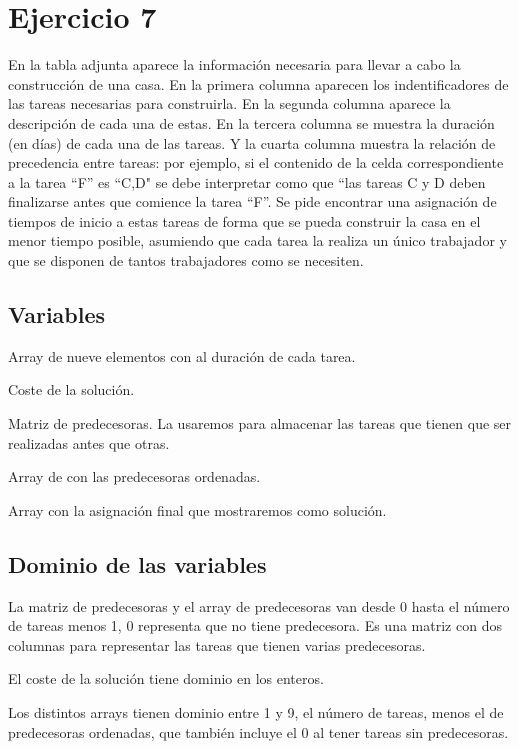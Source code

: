 \documentclass[11pt, spanish]{article}
\begin{document}
\newpage

\section{Ejercicio 7}

En la tabla adjunta aparece la información necesaria para llevar a cabo la construcción de una casa. En la primera columna aparecen los indentificadores de las tareas necesarias para
construirla. En la segunda columna aparece la descripción de cada una de estas. En la tercera columna se muestra la duración (en días) de cada una de las tareas. Y la cuarta columna muestra la relación de precedencia entre tareas: por ejemplo, si el contenido de la celda correspondiente a la tarea “F” es “C,D" se debe interpretar como que “las tareas C y D deben finalizarse antes que comience la tarea “F”. Se pide encontrar una asignación de tiempos de inicio a estas tareas de forma que se pueda construir la casa en el menor tiempo posible, asumiendo que cada tarea la realiza un único trabajador y que se disponen de tantos trabajadores como se necesiten.

\subsection{Variables}

Array de nueve elementos con al duración de cada tarea.

Coste de la solución.

Matriz de predecesoras. La usaremos para almacenar las tareas que tienen que ser realizadas antes que otras.

Array de con las predecesoras ordenadas.

Array con la asignación final que mostraremos como solución.

\subsection{Dominio de las variables}

La matriz de predecesoras y el array de predecesoras van desde 0 hasta el número de tareas menos 1, 0 representa que no tiene predecesora. Es una matriz con dos columnas para representar las tareas que tienen varias predecesoras.

El coste de la solución tiene dominio en los enteros.

Los distintos arrays tienen dominio entre 1 y 9, el número de tareas, menos el de predecesoras ordenadas, que también incluye el 0 al tener tareas sin predecesoras.
\end{document}
